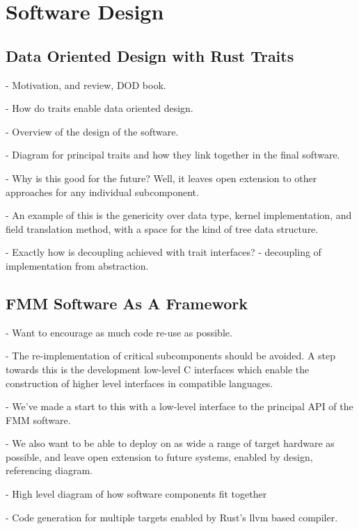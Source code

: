 \chapter{Software Design}\label{chpt:software_design}
\thispagestyle{chaptertitle} %


\section{Data Oriented Design with Rust Traits}

- Motivation, and review, DOD book.

- How do traits enable data oriented design.

- Overview of the design of the software.

- Diagram for principal traits and how they link together in the final software.

- Why is this good for the future? Well, it leaves open extension to other approaches for any individual subcomponent.

- An example of this is the genericity over data type, kernel implementation, and field translation method, with a space for the kind of tree data structure.

- Exactly how is decoupling achieved with trait interfaces?
    - decoupling of implementation from abstraction.

\section{FMM Software As A Framework}

- Want to encourage as much code re-use as possible.

- The re-implementation of critical subcomponents should be avoided. A step towards this is the development low-level C interfaces which enable the construction of higher level interfaces in compatible languages.

- We've made a start to this with a low-level interface to the principal API of the FMM software.

- We also want to be able to deploy on as wide a range of target hardware as possible, and leave open extension to future systems, enabled by design, referencing diagram.

- High level diagram of how software components fit together


- Code generation for multiple targets enabled by Rust's llvm based compiler.

